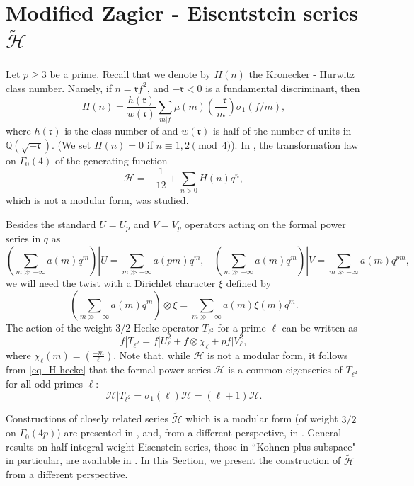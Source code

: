 \documentclass[11pt,letterpaper]{amsart}
\newcommand{\Q}{{\mathbb Q}}
\newcommand{\cH}{{\mathcal H}}
\newcommand{\gr}{{\mathfrak r}}
\theoremstyle{remark}
\begin{document}

\section{Modified Zagier - Eisentstein series $\tilde{\cH}$} \label{sec_ZE}

Let $p \geq 3$ be a prime. Recall that we denote by $H(n)$ the Kronecker - Hurwitz class number. Namely, if $n=\gr f^2$, and $-\gr<0$ is a fundamental discriminant, then 
\begin{equation} \label{eq_H-hecke}
H(n) = \frac{h(\gr)}{w(\gr)} \sum_{m|f} \mu(m) \left( \frac{-\gr}{m} \right) \sigma_1(f/m),
\end{equation}
where $h(\gr)$ is the class number of and $w(\gr)$ is half of the number of units in $\Q(\sqrt{-\gr})$. (We set $H(n)=0$ if $n \equiv 1,2 \pmod{4}$). 
 In \cite{Zagier_eis}, the transformation law on $\Gamma_0(4)$ of the generating function  
\[
\cH = -\frac{1}{12}+\sum_{n>0} H(n) q^n,
\]
which is not a modular form, was studied. 

Besides the standard $U=U_p$ and $V=V_p$ operators acting on the formal power series in $q$ as
\[
\left. \left( \sum_{m \gg -\infty}  a(m) q^m \right) \right|U = \sum_{m \gg -\infty}  a(pm) q^m, ~~ ~~ \left. \left( \sum_{m \gg -\infty}  a(m) q^m \right) \right|V = \sum_{m \gg -\infty}  a(m) q^{pm},
\]
we will need the twist with a Dirichlet character $\xi$ defined by
\[
\left( \sum_{m \gg -\infty}  a(m) q^m \right) \otimes \xi = \sum_{m \gg -\infty}  a(m) \xi(m) q^m .
\]
The action of the weight $3/2$ Hecke operator $T_{\ell^2}$ for a prime $\ell$ can be written as 
\[
f|T_{\ell^2} = f|U_\ell^2 + f \otimes \chi_\ell + p f|V_\ell^2,
\]
where $\chi_\ell(m) = \left( \frac{-m}{\ell} \right)$.
Note that, while $\cH$ is not a modular form, it follows from \eqref{eq_H-hecke} that the formal power series $\cH$ is a common eigenseries of $T_{\ell^2}$ for all odd primes $\ell$:
\[
\cH|T_{\ell^2} = \sigma_1(\ell) \cH = (\ell+1) \cH.
\]

Constructions of closely related series $\tilde{\cH}$ which is a modular form (of weight $3/2$ on  $\Gamma_0(4p)$) are presented in \cite{Ant_Kohnen}, and, from a different perspective, in \cite[Chapter 12]{Gross}. General results on half-integral weight Eisenstein series, those in ``Kohnen plus subspace" in particular, are available in \cite{Wang_Pei}. In this Section, we present the construction of $\tilde{\cH}$ from a different perspective. 
\end{document}
